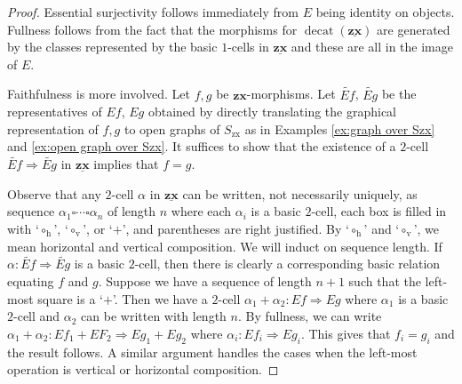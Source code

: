 \documentclass[a4paper,UKenglish]{lipics-v2016}
\begin{document}
\begin{proof}
	Essential surjectivity follows immediately from $E$ being identity on objects.  Fullness follows from the fact that the morphisms for $\operatorname{decat}(\underline{\mathbf{zx}})$ are generated by the classes represented by the basic $1$-cells in $\underline{\mathbf{zx}}$ and these are all in the image of $E$. 
	
	Faithfulness is more involved. Let $f,g$ be $\mathbf{zx}$-morphisms. Let $\widetilde{Ef}$, $\widetilde{Eg}$ be the representatives of $Ef$, $Eg$ obtained by directly translating the graphical representation of $f,g$ to open graphs of $S_{\text{zx}}$ as in Examples \ref{ex:graph over Szx}  and \ref{ex:open graph over Szx}. It suffices to show that the existence of a $2$-cell $\widetilde{Ef} \Rightarrow \widetilde{Eg}$ in $\underline{\mathbf{zx}}$ implies that $f=g$.  
	
	Observe that any $2$-cell $\alpha$ in $\underline{\mathbf{zx}}$ can be written, not necessarily uniquely, as sequence $\alpha_1 \square \dotsm \square \alpha_n$ of length $n$ where each $\alpha_i$ is a basic $2$-cell, each box is filled in with `$\circ_\text{h}$', `$\circ_\text{v}$', or `$+$', and parentheses are right justified.  By `$\circ_\text{h}$' and `$\circ_\text{v}$', we mean horizontal and vertical composition. We will induct on sequence length.  If $\alpha \colon \widetilde{Ef} \Rightarrow \widetilde{Eg}$ is a basic $2$-cell, then there is clearly a corresponding basic relation equating $f$ and $g$.  Suppose we have a sequence of length $n+1$ such that the left-most square is a `$+$'. Then we have a $2$-cell $\alpha_1 + \alpha_2 \colon Ef \Rightarrow Eg$ where $\alpha_1$ is a basic $2$-cell and $\alpha_2$ can be written with length $n$.   By fullness, we can write $\alpha_1 + \alpha_2 \colon Ef_1 + EF_2 \Rightarrow Eg_1 + Eg_2$ where $\alpha_i \colon Ef_i \Rightarrow Eg_i$.   This gives that $f_i = g_i$  and the result follows.  A similar argument handles the cases when the left-most operation is vertical or horizontal composition.
\end{proof}

%
%


%
\end{document}
